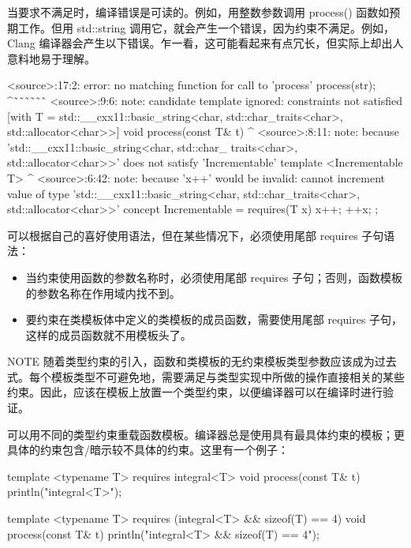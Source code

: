 当要求不满足时，编译错误是可读的。例如，用整数参数调用 process() 函数如预期工作。但用 std::string 调用它，就会产生一个错误，因为约束不满足。例如，Clang 编译器会产生以下错误。乍一看，这可能看起来有点冗长，但实际上却出人意料地易于理解。

\begin{shell}
<source>:17:2: error: no matching function for call to 'process'
        process(str);
        ^˜˜˜˜˜˜
<source>:9:6: note: candidate template ignored: constraints not satisfied [with T =
std::__cxx11::basic_string<char, std::char_traits<char>, std::allocator<char>>]
void process(const T& t)
     ^
<source>:8:11: note: because 'std::__cxx11::basic_string<char, std::char_
traits<char>, std::allocator<char>>' does not satisfy 'Incrementable'
template <Incrementable T>
          ^
<source>:6:42: note: because 'x++' would be invalid: cannot increment value of type
'std::__cxx11::basic_string<char, std::char_traits<char>, std::allocator<char>>'
concept Incrementable = requires(T x) { x++; ++x; };
\end{shell}

可以根据自己的喜好使用语法，但在某些情况下，必须使用尾部 requires 子句语法：

\begin{itemize}
\item
当约束使用函数的参数名称时，必须使用尾部 requires 子句；否则，函数模板的参数名称在作用域内找不到。

\item
要约束在类模板体中定义的类模板的成员函数，需要使用尾部 requires 子句，这样的成员函数就不用模板头了。
\end{itemize}

\begin{myNotic}{NOTE}
随着类型约束的引入，函数和类模板的无约束模板类型参数应该成为过去式。每个模板类型不可避免地，需要满足与类型实现中所做的操作直接相关的某些约束。因此，应该在模板上放置一个类型约束，以便编译器可以在编译时进行验证。
\end{myNotic}


可以用不同的类型约束重载函数模板。编译器总是使用具有最具体约束的模板；更具体的约束包含/暗示较不具体的约束。这里有一个例子：

\begin{cpp}
template <typename T> requires integral<T>
void process(const T& t) { println("integral<T>"); }

template <typename T> requires (integral<T> && sizeof(T) == 4)
void process(const T& t) { println("integral<T> && sizeof(T) == 4"); }
\end{cpp}

